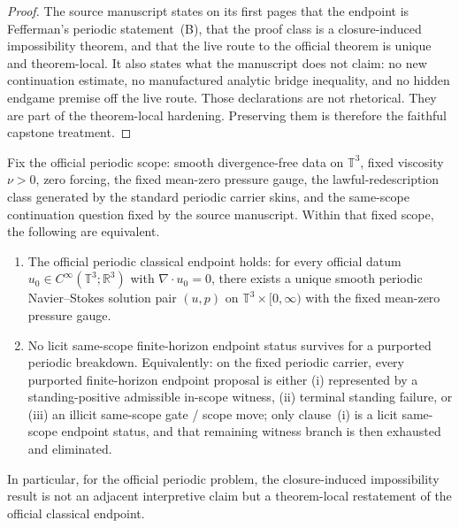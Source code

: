 \begin{proof}
The source manuscript states on its first pages that the endpoint is Fefferman's periodic statement~(B), that the proof class is a closure-induced impossibility theorem, and that the live route to the official theorem is unique and theorem-local. It also states what the manuscript does not claim: no new continuation estimate, no manufactured analytic bridge inequality, and no hidden endgame premise off the live route. Those declarations are not rhetorical. They are part of the theorem-local hardening. Preserving them is therefore the faithful capstone treatment.\cite{MaleyCarrierNS}
\end{proof}

\begin{theorem}
\label{thm:ns-closure-classical-equivalence}
Fix the official periodic scope: smooth divergence-free data on $\mathbb{T}^3$, fixed viscosity $\nu>0$, zero forcing, the fixed mean-zero pressure gauge, the lawful-redescription class generated by the standard periodic carrier skins, and the same-scope continuation question fixed by the source manuscript. Within that fixed scope, the following are equivalent.
\begin{enumerate}
  \item The official periodic classical endpoint holds: for every official datum $u_0\in C^\infty(\mathbb{T}^3;\mathbb{R}^3)$ with $\nabla\!\cdot u_0=0$, there exists a unique smooth periodic Navier--Stokes solution pair $(u,p)$ on $\mathbb{T}^3\times [0,\infty)$ with the fixed mean-zero pressure gauge.
  \item No licit same-scope finite-horizon endpoint status survives for a purported periodic breakdown. Equivalently: on the fixed periodic carrier, every purported finite-horizon endpoint proposal is either (i) represented by a standing-positive admissible in-scope witness, (ii) terminal standing failure, or (iii) an illicit same-scope gate / scope move; only clause~(i) is a licit same-scope endpoint status, and that remaining witness branch is then exhausted and eliminated.
\end{enumerate}
In particular, for the official periodic problem, the closure-induced impossibility result is not an adjacent interpretive claim but a theorem-local restatement of the official classical endpoint.
\end{theorem}

